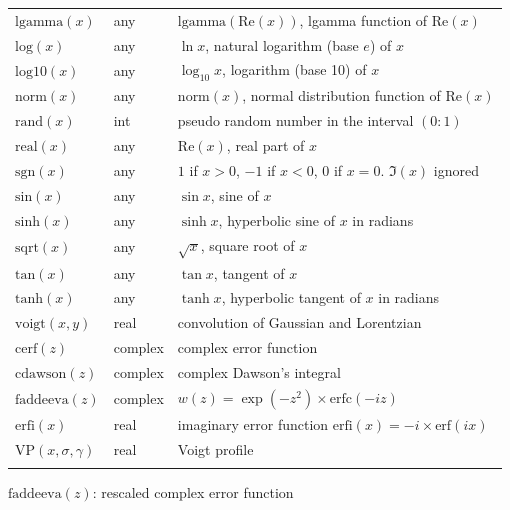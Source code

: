 \documentclass[
  hyper, lang=cn, 
  class=l3dox, 
]{../../zlatex/code/ztex}
\begin{document}
\begin{center}
\begin{longtable}{lll}
    \(\text{lgamma}(x)\) & any & $\text{lgamma}(\text{Re}(x))$, lgamma function of $\text{Re}(x)$ \\
    \(\text{log}(x)\) & any & $\ln x$, natural logarithm (base $e$) of $x$ \\
    \(\text{log10}(x)\) & any & $\log_{10} x$, logarithm (base 10) of $x$ \\
    \(\text{norm}(x)\) & any & $\text{norm}(x)$, normal distribution function of $\text{Re}(x)$ \\
    \(\text{rand}(x)\) & int & pseudo random number in the interval $(0:1)$ \\
    \(\text{real}(x)\) & any & $\text{Re}(x)$, real part of $x$ \\
    \(\text{sgn}(x)\) & any & $1$ if $x > 0$, $-1$ if $x < 0$, $0$ if $x = 0$. $\Im(x)$ ignored \\
    \(\text{sin}(x)\) & any & $\sin x$, sine of $x$ \\
    \(\text{sinh}(x)\) & any & $\sinh x$, hyperbolic sine of $x$ in radians \\
    \(\text{sqrt}(x)\) & any & $\sqrt{x}$, square root of $x$ \\
    \(\text{tan}(x)\) & any & $\tan x$, tangent of $x$ \\
    \(\text{tanh}(x)\) & any & $\tanh x$, hyperbolic tangent of $x$ in radians \\
    \(\text{voigt}(x,y)\) & real & convolution of Gaussian and Lorentzian \\
    \(\text{cerf}(z)\) & complex & complex error function \\
    \(\text{cdawson}(z)\) & complex & complex Dawson's integral \\
    \(\text{faddeeva}(z)\) & complex & $w(z) = \exp(-z^2) \times \text{erfc}(-iz)$ \\
    \(\text{erfi}(x)\) & real & imaginary error function $\text{erfi}(x) = -i \times \text{erf}(ix)$ \\
    \(\text{VP}(x,\sigma,\gamma)\) & real & Voigt profile \\
    \bottomrule 
    \label{tab:gnuplot-functions}\\
  \end{longtable}
\end{center}
\vspace*{-4em}

\begin{remark}
  \(\text{faddeeva}(z)\): rescaled complex error function
\end{remark}
\end{document}
